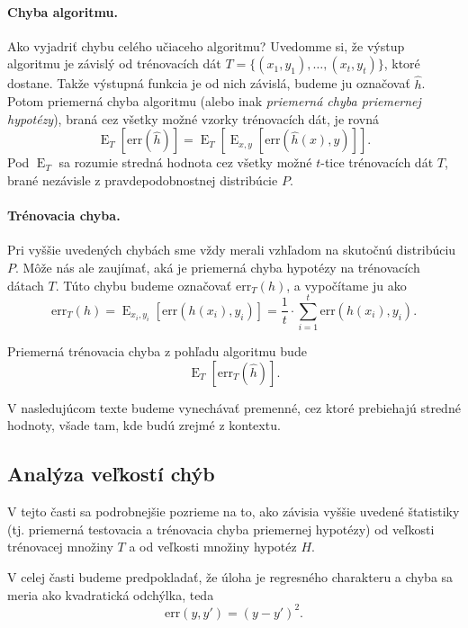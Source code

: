 \documentclass[a4paper,11pt]{article}
\theoremstyle{plain}
\theoremstyle{remark}
\theoremstyle{definition}
\newcommand{\err}{\mathrm{err}}
\DeclareMathOperator*{\E}{\mathrm{E}}
\begin{document}
  \paragraph{Chyba algoritmu.}
  Ako vyjadriť chybu celého učiaceho algoritmu? Uvedomme si, že výstup
  algoritmu je závislý od trénovacích dát $T = \{(x_1, y_1), \ldots, (x_t, y_t)\}$,
  ktoré dostane. Takže výstupná funkcia je od nich závislá, budeme ju
  označovať $\hat{h}$. Potom priemerná chyba algoritmu (alebo inak
  \emph{priemerná chyba priemernej hypotézy}), braná cez všetky možné
  vzorky trénovacích dát, je rovná
  $$\E_T \left[ \err(\hat{h}) \right] = \E_T \left[ \E_{x,y} \left[ \err(\hat{h}(x), y) \right] \right].$$
  Pod $\E_T$ sa rozumie stredná hodnota cez všetky možné $t$-tice
  trénovacích dát $T$, brané nezávisle z pravdepodobnostnej
  distribúcie $P$.
  
  \paragraph{Trénovacia chyba.}
  Pri vyššie uvedených chybách sme vždy merali vzhľadom na skutočnú
  distribúciu $P$. Môže nás ale zaujímať, aká je priemerná chyba
  hypotézy na trénovacích dátach $T$. Túto chybu budeme označovať
  $\err_T(h)$, a vypočítame ju ako
  $$\err_T(h) = \E_{x_i, y_i} \left[ \err(h(x_i), y_i) \right] = \frac{1}{t} \cdot \sum_{i=1}^t \err(h(x_i), y_i).$$
  
  Priemerná trénovacia chyba z pohľadu algoritmu bude
  $$\E_T \left[ \err_T(\hat{h}) \right].$$
  
  V nasledujúcom texte budeme vynechávať premenné, cez ktoré prebiehajú
  stredné hodnoty, všade tam, kde budú zrejmé z kontextu.
  
  
  \subsection{Analýza veľkostí chýb}
  
  V tejto časti sa podrobnejšie pozrieme na to, ako závisia vyššie
  uvedené štatistiky (tj. priemerná testovacia a trénovacia chyba
  priemernej hypotézy) od veľkosti trénovacej množiny $T$ a od veľkosti
  množiny hypotéz $H$.
  
  V celej časti budeme predpokladať, že úloha je regresného
  charakteru a chyba sa meria ako kvadratická odchýlka, teda
  $$\err(y, y') = (y - y')^2.$$
  
\end{document}
